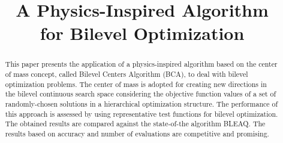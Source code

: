 \documentclass[conference]{IEEEtran}
\begin{document}
%
\title{A Physics-Inspired Algorithm\\ for Bilevel Optimization}


\author{
\and
}

\maketitle

\thispagestyle{firststyle}
\renewcommand{\headrulewidth}{0in}
\pagestyle{empty}


\pagestyle{fancy}



\begin{abstract}
This paper presents the application of a physics-inspired algorithm based on the 
center of mass concept, called Bilevel Centers Algorithm (BCA), to deal with 
bilevel optimization problems. The center of mass is adopted for creating new directions 
in the bilevel continuous search space considering the objective function values of a set 
of randomly-chosen solutions in a hierarchical optimization structure. The performance of this
approach is assessed by using representative test functions for bilevel optimization.
The obtained results are compared against the state-of-the algorithm BLEAQ. The
results based on accuracy and number of evaluations are competitive and promising.
\end{abstract}
\end{document}
